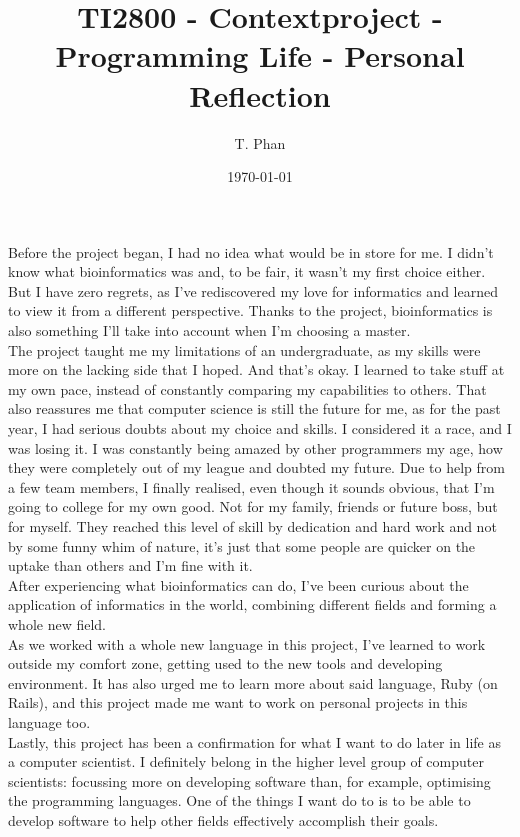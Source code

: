 \documentclass{article}
\title{TI2800 - Contextproject - Programming Life - Personal Reflection}
\author{T. Phan}
\date{\today}
\begin{document}
	\maketitle
	
	Before the project began, I had no idea what would be in store for me. I didn't know what bioinformatics was and, to be fair, it wasn't my first choice either. But I have zero regrets, as I've rediscovered my love for informatics and learned to view it from a different perspective. Thanks to the project, bioinformatics is also something I'll take into account when I'm choosing a master.\\

	The project taught me my limitations of an undergraduate, as my skills were more on the lacking side that I hoped. And that's okay. I learned to take stuff at my own pace, instead of constantly comparing my capabilities to others. That also reassures me that computer science is still the future for me, as for the past year, I had serious doubts about my choice and skills. I considered it a race, and I was losing it. I was constantly being amazed by other programmers my age, how they were completely out of my league and doubted my future. Due to help from a few team members, I finally realised, even though it sounds obvious, that I'm going to college for my own good. Not for my family, friends or future boss, but for myself. They reached this level of skill by dedication and hard work and not by some funny whim of nature, it's just that some people are quicker on the uptake than others and I'm fine with it.\\

	After experiencing what bioinformatics can do, I've been curious about the application of informatics in the world, combining different fields and forming a whole new field.\\

	As we worked with a whole new language in this project, I've learned to work outside my comfort zone, getting used to the new tools and developing environment. It has also urged me to learn more about said language, Ruby (on Rails), and this project made me want to work on personal projects in this language too.\\

	Lastly, this project has been a confirmation for what I want to do later in life as a computer scientist. I definitely belong in the higher level group of computer scientists: focussing more on developing software than, for example, optimising the programming languages. One of the things I want do to is to be able to develop software to help other fields effectively accomplish their goals.
\end{document}
